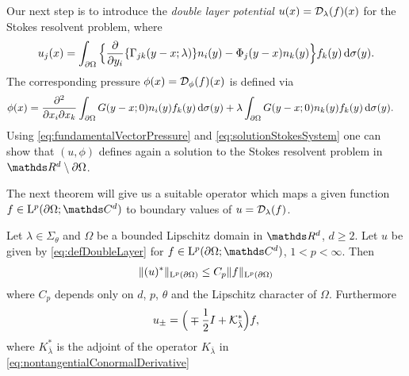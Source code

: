 Our next step is to introduce the \emph{double layer potential} $u(x) = \mathcal{D}_\lambda(f)(x)$ for the Stokes resolvent problem, where
\begin{align}
  \label{eq:defDoubleLayer}
  u_j(x) = \int_{\partial\Omega} \Big\{ \frac{\partial}{\partial y_i} \{ \Gamma_{jk}(y - x; \lambda) \} n_i(y) - \Phi_j(y - x) n_k(y) \Big\} f_k(y) \, {\operatorname{d}\!{\sigma}}(y).
\end{align}
The corresponding pressure $\phi(x) = \mathcal{D}_{\phi}(f)(x)$ is defined via
\begin{align}
  \label{eq:defDoubleLayerPressure}
  \phi(x)
  &= \frac{\partial^2}{\partial x_i \partial x_k} \int_{\partial\Omega} G(y - x; 0) n_i(y) f_k(y) \, {\operatorname{d}\!{\sigma}}(y) + \lambda \int_{\partial\Omega} G(y - x; 0) n_k(y) f_k(y) \, {\operatorname{d}\!{\sigma}}(y).
\end{align}
Using \ref{eq:fundamentalVectorPressure} and \ref{eq:solutionStokesSystem} one can show that $(u,\phi)$ defines again a solution to the Stokes resolvent problem in $\R^d \setminus \partial\Omega$.

The next theorem will give us a suitable operator which maps a given function $f \in \Ell^p(\partial\Omega; \C^d)$ to boundary values of $u = \mathcal{D}_\lambda(f)$.

\begin{thm}
  \label{thm:nontangentialLimitDoubleLayer}
Let $\lambda \in \Sigma_\theta$ and $\Omega$ be a bounded Lipschitz domain in $\R^d$, $d \geq 2$.
Let $u$ be given by \eqref{eq:defDoubleLayer} for $f \in \Ell^p(\partial\Omega; \C^d)$, $1 < p < \infty$.
Then
\begin{align}
  \label{eq:lpBoundednessUNontangentialMax}
  \|(u)^*\|_{\mathrm{L}^p(\partial\Omega)} \leq C_p \|f\|_{\mathrm{L}^p(\partial\Omega)}
\end{align}
where $C_p$ depends only on $d$, $p$, $\theta$ and the Lipschitz character of $\Omega$.
Furthermore 
\begin{align}
  \label{eq:nontangentialLimitDoubleLayer}
  u_\pm = \Big(\mp \frac{1}{2} I + \mathcal{K}_{\bar\lambda}^* \Big) f,
\end{align}
where $K_{\bar\lambda}^*$ is the adjoint of the operator $K_{\bar\lambda}$ in \eqref{eq:nontangentialConormalDerivative}
\end{thm}

